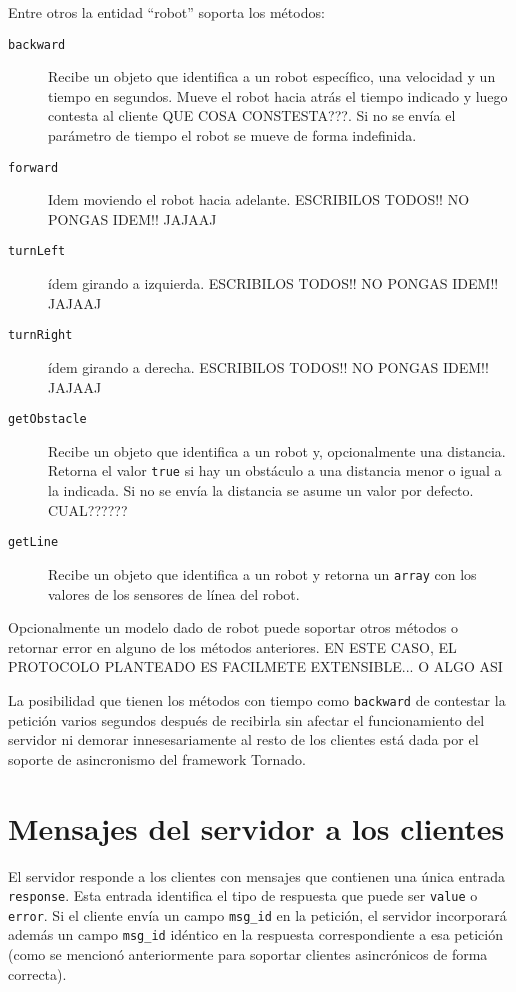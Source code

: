Entre otros la entidad ``robot'' soporta los métodos:
\begin{description}
    \item[\texttt{backward}] Recibe un objeto que identifica a un robot
        específico, una velocidad y un tiempo en segundos. Mueve el robot hacia atrás el tiempo indicado y luego contesta al cliente QUE COSA CONSTESTA???. Si no se envía el parámetro de tiempo el robot se mueve
        de forma indefinida.
    \item[\texttt{forward}] Idem moviendo el robot hacia adelante. ESCRIBILOS TODOS!! NO PONGAS IDEM!! JAJAAJ
    \item[\texttt{turnLeft}] ídem girando a izquierda. ESCRIBILOS TODOS!! NO PONGAS IDEM!! JAJAAJ
    \item[\texttt{turnRight}] ídem girando a derecha. ESCRIBILOS TODOS!! NO PONGAS IDEM!! JAJAAJ
    \item[\texttt{getObstacle}] Recibe un objeto que identifica a un robot y,
        opcionalmente una distancia. Retorna el valor 
        \texttt{true} si hay un obstáculo a una distancia menor o igual a la
        indicada. Si no se envía la distancia se asume un valor por defecto. CUAL??????
    \item[\texttt{getLine}] Recibe un objeto que identifica a un robot y
        retorna un \texttt{array}
        con los valores de los sensores de línea del robot.
\end{description}


Opcionalmente un modelo dado de robot puede soportar otros métodos o retornar
error en alguno de los métodos anteriores. EN ESTE CASO, EL PROTOCOLO PLANTEADO ES FACILMETE EXTENSIBLE... O ALGO ASI


La posibilidad que tienen los métodos con tiempo como \texttt{backward} de
contestar la petición varios segundos después de recibirla sin afectar
el funcionamiento del servidor ni demorar innesesariamente al resto de los
clientes está dada por el soporte de asincronismo del framework Tornado.

\section{Mensajes del servidor a los clientes}

El servidor responde a los clientes con mensajes que contienen una única
entrada \texttt{response}. Esta entrada identifica el tipo de respuesta
que puede ser \texttt{value} o \texttt{error}. Si el cliente envía un
campo \texttt{msg\_id} en la petición, el servidor incorporará además
un campo \texttt{msg\_id} idéntico en la respuesta correspondiente
a esa petición (como se mencionó anteriormente para soportar
clientes asincrónicos de forma correcta).

